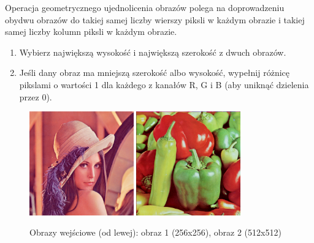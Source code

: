 \documentclass[final,a4paper,openany,12pt]{mwbk}
\begin{document}
Operacja geometrycznego ujednolicenia obrazów polega na doprowadzeniu obydwu obrazów do takiej samej liczby wierszy piksli w każdym obrazie i takiej samej liczby kolumn piksli w każdym obrazie.
\begin{enumerate}
	\item Wybierz największą wysokość i największą szerokość z dwuch obrazów.
	\item Jeśli dany obraz ma mniejszą szerokość albo wysokość, wypełnij różnicę pikslami o wartości 1 dla każdego z kanałów R, G i B (aby uniknąć dzielenia przez 0).
\end{enumerate}

\begin{figure}[H]
	\begin{center}
		\includegraphics[width=0.4\textwidth]{lena_color}
		\includegraphics[width=0.4\textwidth]{peppers_color}
	\end{center}
	\caption{Obrazy wejściowe (od lewej): obraz 1 (256x256), obraz 2 (512x512)}
\end{figure}
\end{document}
